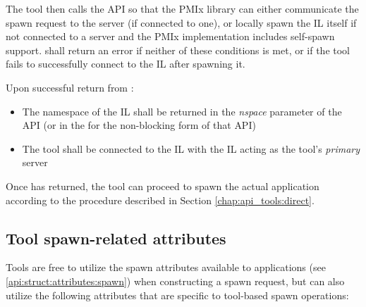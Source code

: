 The tool then calls the  \ac{API} so that the \ac{PMIx} library can either communicate the spawn request to the server (if connected to one), or locally spawn the \ac{IL} itself if not connected to a server and the \ac{PMIx} implementation includes self-spawn support.  shall return an error if neither of these conditions is met, or if the tool fails to successfully connect to the \ac{IL} after spawning it.

Upon successful return from :

\begin{itemize}
    \item The namespace of the \ac{IL} shall be returned in the \emph{nspace} parameter of the  \ac{API} (or in the  for the non-blocking form of that \ac{API})
    \item The tool shall be connected to the \ac{IL} with the \ac{IL} acting as the tool's \emph{primary} server
\end{itemize}

Once  has returned, the tool can proceed to spawn the actual application according to the procedure described in Section \ref{chap:api_tools:direct}.

\subsection{Tool spawn-related attributes}
\label{api:tools:attributes:spawn}

Tools are free to utilize the spawn attributes available to applications (see \ref{api:struct:attributes:spawn}) when constructing a spawn request, but can also utilize the following attributes that are specific to tool-based spawn operations:

%

%

